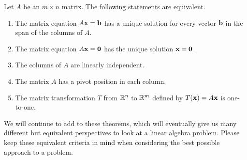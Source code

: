 \begin{theorem} \label{thm:IMT_1_g_b} Let $A$ be an $m \times n$ matrix. The following statements are equivalent.
    \begin{enumerate}
    \item The matrix equation $A \mathbf{x} = \mathbf{b}$ has a unique solution for every vector $\mathbf{b}$ in the span of the columns of $A$.
    \item The matrix equation $A \mathbf{x} = \mathbf{0}$ has the unique solution $\mathbf{x} = \mathbf{0}$.
    \item The columns of $A$ are linearly independent.
    \item The matrix $A$ has a pivot position in each column. 
    \item The matrix transformation $T$ from $\mathbb{R}^n$ to $\mathbb{R}^m$ defined by $T(\mathbf{x}) = A\mathbf{x}$ is one-to-one.
    \end{enumerate}
\end{theorem}


We will continue to add to these theorems, which will eventually give us many different but equivalent perspectives to look at a linear algebra problem. Please keep these equivalent criteria in mind when considering the best possible approach to a problem.


\ExampleIntro

